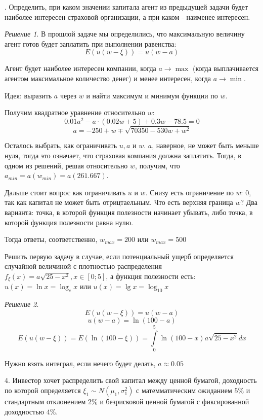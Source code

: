 \documentclass[%
12pt, %
final, %
oneside, %
onecolumn, %
centertags]{article} %
\theoremstyle{plain}
\theoremstyle{definition}
\theoremstyle{remark}
\newtheorem{solution}{Решение}
\begin{document}
. Определить, при каком значении капитала агент из предыдущей задачи будет наиболее интересен страховой организации, а при каком - наименее интересен.

\begin{solution}
	В прошлой задаче мы определились, что максимальную величину агент готов будет заплатить при выполнении равенства:
	$$E(u(w-\xi)) = u(w - a)$$

	Агент будет наиболее интересен компании, когда $a \to \max$ (когда выплачивается агентом максимальное количество денег) и менее интересен, когда $a \to \min$.

	Идея: выразить $a$ через $w$ и найти максимум и минимум функции по $w$.

	Получим квадратное уравнение относительно $w$:
	$$0.01a^2 - a \cdot (0.02w+5) + 0.3w - 78.5 = 0$$
	$$a = -250 + w \mp \sqrt{70350-530w+w^2}$$

	Осталось выбрать, как ограничивать $u,a$ и $w$. $a$, наверное, не может быть меньше нуля, тогда это означает, что страховая компания должна заплатить. Тогда, в одном из решений, решая относительно $w$, получим, что $a_{min} = a(w_{min}) = a(261.667)$.

	Дальше стоит вопрос как ограничивать $u$ и $w$. Снизу есть ограничение по $w$: 0, так как капитал не может быть отрицтаельным. Что есть верхняя граница $w$? Два варианта: точка, в которой функция полезности начинает убывать, либо точка, в которой функция полезности равна нулю.

	Тогда ответы, соответственно, $w_{max} = 200$ или $w_{max} = 500$
\end{solution}

 Решить первую задачу в случае, если потенциальный ущерб определяется случайной величиной с плотностью распределения $f_{\xi}(x) = a\sqrt{25-x^2}, x \in [0;5]$, а функция полезности есть:
$u(x) = \ln x = \log_e x $ или $u(x) = \lg x = \log_{10} x$

\begin{solution}
	$$E(u(w-\xi)) = u(w - a)$$
	$$u(w-a) = \ln(100 - a)$$
	$$E(u(w-\xi)) = E\left(\ln(100-\xi)\right) = \int\limits_{0}^5 \ln(100 - x) a\sqrt{25-x^2}dx$$

	Нужно взять интеграл, если нечего будет делать, $a \approx 0.05$
\end{solution}

4. Инвестор хочет распределить свой капитал между ценной бумагой, доходность по которой определяется $\xi_1 \sim N(\mu_1,\sigma_1^2)$ с матемматическим ожиданием $5\%$ и стандартным отклонением $2\%$ и безрисковой ценной бумагой с фиксированной доходностью $4\%$. 
\end{document}
